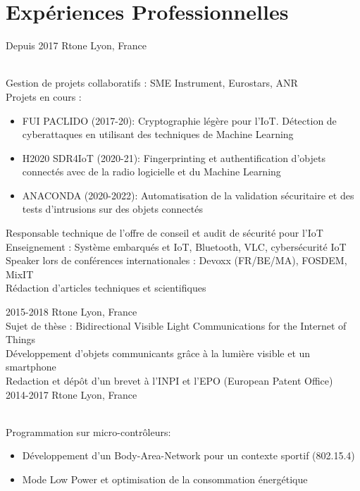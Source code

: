 \documentclass[]{cv-style}          %
\begin{document}
\section{Expériences Professionnelles}

\begin{entrylist}
\entry
  {Depuis 2017}
  {Rtone}
  {Lyon, France}
  {\\
  Gestion de projets collaboratifs : SME Instrument, Eurostars, ANR\\
  Projets en cours :
\begin{itemize}
    \item FUI PACLIDO (2017-20): Cryptographie légère pour l'IoT. Détection de cyberattaques en utilisant des techniques de Machine Learning
    \item H2020 SDR4IoT (2020-21): Fingerprinting et authentification d'objets connectés avec de la radio logicielle et du Machine Learning
    \item ANACONDA (2020-2022): Automatisation de la validation sécuritaire et des tests d'intrusions sur des objets connectés
\end{itemize}
Responsable technique de l'offre de conseil et audit de sécurité pour l'IoT\\
Enseignement : Système embarqués et IoT, Bluetooth, VLC, cybersécurité IoT\\
Speaker lors de conférences internationales : Devoxx (FR/BE/MA), FOSDEM, MixIT\\
Rédaction d'articles techniques et scientifiques
}
\entry
  {2015-2018}
  {Rtone}
  {Lyon, France}
  {\\
  Sujet de thèse : Bidirectional Visible Light Communications for the Internet of Things\\ 
  Développement d'objets communicants grâce à la lumière visible et un smartphone\\
  Redaction et dépôt d'un brevet à l'INPI et l'EPO (European Patent Office)\\
 }
\entry
  {2014-2017}
  {Rtone}
  {Lyon, France}
  {\\
  Programmation sur micro-contrôleurs:
  \begin{itemize}
    \item Développement d'un Body-Area-Network pour un contexte sportif (802.15.4)
    \item Mode Low Power et optimisation de la consommation énergétique

\end{itemize}}
\end{entrylist}
\end{document}

